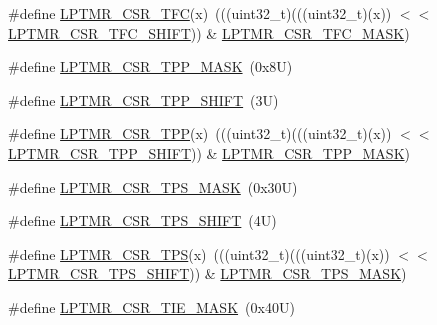 \begin{DoxyCompactItemize}
\item 
\#define \mbox{\hyperlink{group___l_p_t_m_r___register___masks_ga9f9f9658cf9a8a4d04923d1487adae6a}{L\+P\+T\+M\+R\+\_\+\+C\+S\+R\+\_\+\+T\+FC}}(x)~(((uint32\+\_\+t)(((uint32\+\_\+t)(x)) $<$$<$ \mbox{\hyperlink{group___l_p_t_m_r___register___masks_gaee3d1b59f30f6217f1f74b18cf973c4a}{L\+P\+T\+M\+R\+\_\+\+C\+S\+R\+\_\+\+T\+F\+C\+\_\+\+S\+H\+I\+FT}})) \& \mbox{\hyperlink{group___l_p_t_m_r___register___masks_gaca581598c0f319b0002deda730479842}{L\+P\+T\+M\+R\+\_\+\+C\+S\+R\+\_\+\+T\+F\+C\+\_\+\+M\+A\+SK}})
\item 
\#define \mbox{\hyperlink{group___l_p_t_m_r___register___masks_ga020eee1550f2943c10d51f8b56930e62}{L\+P\+T\+M\+R\+\_\+\+C\+S\+R\+\_\+\+T\+P\+P\+\_\+\+M\+A\+SK}}~(0x8\+U)
\item 
\#define \mbox{\hyperlink{group___l_p_t_m_r___register___masks_ga62be70d70bd4e88e26e5cc8437f6fd55}{L\+P\+T\+M\+R\+\_\+\+C\+S\+R\+\_\+\+T\+P\+P\+\_\+\+S\+H\+I\+FT}}~(3\+U)
\item 
\#define \mbox{\hyperlink{group___l_p_t_m_r___register___masks_ga1e706f8fb1de17fa05f83c3a8928a91c}{L\+P\+T\+M\+R\+\_\+\+C\+S\+R\+\_\+\+T\+PP}}(x)~(((uint32\+\_\+t)(((uint32\+\_\+t)(x)) $<$$<$ \mbox{\hyperlink{group___l_p_t_m_r___register___masks_ga62be70d70bd4e88e26e5cc8437f6fd55}{L\+P\+T\+M\+R\+\_\+\+C\+S\+R\+\_\+\+T\+P\+P\+\_\+\+S\+H\+I\+FT}})) \& \mbox{\hyperlink{group___l_p_t_m_r___register___masks_ga020eee1550f2943c10d51f8b56930e62}{L\+P\+T\+M\+R\+\_\+\+C\+S\+R\+\_\+\+T\+P\+P\+\_\+\+M\+A\+SK}})
\item 
\#define \mbox{\hyperlink{group___l_p_t_m_r___register___masks_ga3502ccff1cbdb70bb99b73c035ab1e19}{L\+P\+T\+M\+R\+\_\+\+C\+S\+R\+\_\+\+T\+P\+S\+\_\+\+M\+A\+SK}}~(0x30\+U)
\item 
\#define \mbox{\hyperlink{group___l_p_t_m_r___register___masks_ga7759d842742bfedd91788d41ef12fb8d}{L\+P\+T\+M\+R\+\_\+\+C\+S\+R\+\_\+\+T\+P\+S\+\_\+\+S\+H\+I\+FT}}~(4\+U)
\item 
\#define \mbox{\hyperlink{group___l_p_t_m_r___register___masks_ga21ce2f3d05c087f7f46dcb9b7035e4f2}{L\+P\+T\+M\+R\+\_\+\+C\+S\+R\+\_\+\+T\+PS}}(x)~(((uint32\+\_\+t)(((uint32\+\_\+t)(x)) $<$$<$ \mbox{\hyperlink{group___l_p_t_m_r___register___masks_ga7759d842742bfedd91788d41ef12fb8d}{L\+P\+T\+M\+R\+\_\+\+C\+S\+R\+\_\+\+T\+P\+S\+\_\+\+S\+H\+I\+FT}})) \& \mbox{\hyperlink{group___l_p_t_m_r___register___masks_ga3502ccff1cbdb70bb99b73c035ab1e19}{L\+P\+T\+M\+R\+\_\+\+C\+S\+R\+\_\+\+T\+P\+S\+\_\+\+M\+A\+SK}})
\item 
\#define \mbox{\hyperlink{group___l_p_t_m_r___register___masks_gabb726cb43d5f6ee38339048c69a5f086}{L\+P\+T\+M\+R\+\_\+\+C\+S\+R\+\_\+\+T\+I\+E\+\_\+\+M\+A\+SK}}~(0x40\+U)
$$
\end{DoxyCompactItemize}
